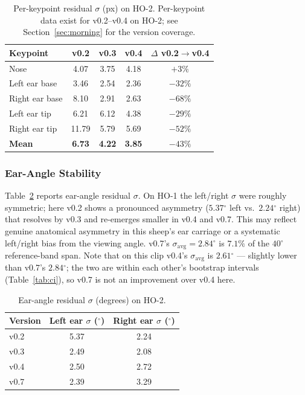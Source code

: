 \documentclass[11pt]{article}
\newcommand{\dgr}{\ensuremath{^{\circ}}}
\newcommand{\sigavg}{\ensuremath{\sigma_{\text{avg}}}}
\begin{document}
\begin{table}[t]
  \centering
  \caption{Per-keypoint residual $\sigma$ (px) on HO-2. Per-keypoint data exist
  for v0.2--v0.4 on HO-2; see Section~\ref{sec:morning} for the version coverage.}
  \label{tab:morningperkpt}
  \begin{tabular}{lcccc}
    \toprule
    Keypoint & v0.2 & v0.3 & v0.4 & $\Delta$ v0.2$\rightarrow$v0.4 \\
    \midrule
    Nose           & 4.07  & 3.75 & 4.18 & $+3\%$ \\
    Left ear base  & 3.46  & 2.54 & 2.36 & $-32\%$ \\
    Right ear base & 8.10  & 2.91 & 2.63 & $-68\%$ \\
    Left ear tip   & 6.21  & 6.12 & 4.38 & $-29\%$ \\
    Right ear tip  & 11.79 & 5.79 & 5.69 & $-52\%$ \\
    \midrule
    \textbf{Mean}  & \textbf{6.73} & \textbf{4.22} & \textbf{3.85} & \textbf{$-43\%$} \\
    \bottomrule
  \end{tabular}
\end{table}

\subsubsection{Ear-Angle Stability}
Table~\ref{tab:morningearangle} reports ear-angle residual $\sigma$. On
HO-1 the left/right $\sigma$ were roughly symmetric; here v0.2 shows a
pronounced asymmetry ($5.37\dgr$ left vs.\ $2.24\dgr$ right) that resolves by v0.3
and re-emerges smaller in v0.4 and v0.7. This may reflect genuine anatomical
asymmetry in this sheep's ear carriage or a systematic left/right bias from the
viewing angle. v0.7's $\sigavg = 2.84\dgr$ is $7.1\%$ of the $40\dgr$ reference-band span.
Note that on this clip v0.4's $\sigavg$ is $2.61\dgr$ --- slightly lower than
v0.7's $2.84\dgr$; the two are within each other's bootstrap intervals
(Table~\ref{tab:ci}), so v0.7 is not an improvement over v0.4 here.

\begin{table}[t]
  \centering
  \caption{Ear-angle residual $\sigma$ (degrees) on HO-2.}
  \label{tab:morningearangle}
  \begin{tabular}{lcc}
    \toprule
    Version & Left ear $\sigma$ (\dgr) & Right ear $\sigma$ (\dgr) \\
    \midrule
    v0.2 & 5.37 & 2.24 \\
    v0.3 & 2.49 & 2.08 \\
    v0.4 & 2.50 & 2.72 \\
    v0.7 & 2.39 & 3.29 \\
    \bottomrule
  \end{tabular}
\end{table}
\end{document}
